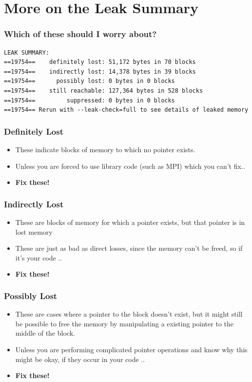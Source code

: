 \documentclass{beamer}
\begin{document}
\section{More on the Leak Summary}

\begin{frame}[fragile]
\frametitle{Which of these should I worry about?}
\begin{lstlisting}
LEAK SUMMARY:
==19754==    definitely lost: 51,172 bytes in 70 blocks
==19754==    indirectly lost: 14,378 bytes in 39 blocks
==19754==      possibly lost: 0 bytes in 0 blocks
==19754==    still reachable: 127,364 bytes in 528 blocks
==19754==         suppressed: 0 bytes in 0 blocks
==19754== Rerun with --leak-check=full to see details of leaked memory
\end{lstlisting}
\end{frame}

\begin{frame}[fragile]
  \frametitle{Definitely Lost}
  \begin{itemize}
    \item These indicate blocks of memory to which no pointer exists. 
    \item Unless you are forced to use library code (such as MPI) which you can't fix..
    \item \textbf{Fix these!}
  \end{itemize}
\end{frame}

\begin{frame}[fragile]
\frametitle{Indirectly Lost}
\begin{itemize}
\item These are blocks of memory for which a pointer exists, but that pointer is in lost memory
\item These are just as bad as direct losses, since the memory can't be freed, so if it's your code ..
\item \textbf{Fix these!}
\end{itemize}
\end{frame}

\begin{frame}[fragile]
\frametitle{Possibly Lost}
\begin{itemize}
\item These are cases where a pointer to the block doesn't exist, but it might still be possible to free the memory by manipulating a existing pointer to the middle of the block.
\item Unless you are performing complicated pointer operations and know why this might be okay, if they occur in your code ..
\item \textbf{Fix these!}
\end{itemize}
\end{frame}
\end{document}
